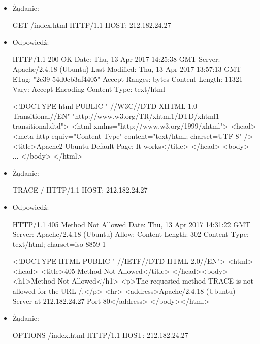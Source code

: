 \begin{itemize}\renewcommand{\labelitemii}{\scriptsize}
\item Żądanie:

\begin{code}
GET /index.html HTTP/1.1
HOST: 212.182.24.27


\end{code}

\item Odpowiedź:

\begin{code}
HTTP/1.1 200 OK
Date: Thu, 13 Apr 2017 14:25:38 GMT
Server: Apache/2.4.18 (Ubuntu)
Last-Modified: Thu, 13 Apr 2017 13:57:13 GMT
ETag: "2c39-54d0cb3af4405"
Accept-Ranges: bytes
Content-Length: 11321
Vary: Accept-Encoding
Content-Type: text/html


<!DOCTYPE html PUBLIC "-//W3C//DTD XHTML 1.0 Transitional//EN" 
"http://www.w3.org/TR/xhtml1/DTD/xhtml1-transitional.dtd">
<html xmlns="http://www.w3.org/1999/xhtml">
  <head>
    <meta http-equiv="Content-Type" content="text/html; charset=UTF-8" />
    <title>Apache2 Ubuntu Default Page: It works</title>
  </head>
  <body>
   ...
  </body>
</html>

\end{code}

\newpage 
\item Żądanie:

\begin{code}
TRACE / HTTP/1.1
HOST: 212.182.24.27

\end{code}

\item Odpowiedź:

\begin{code}
HTTP/1.1 405 Method Not Allowed
Date: Thu, 13 Apr 2017 14:31:22 GMT
Server: Apache/2.4.18 (Ubuntu)
Allow: 
Content-Length: 302
Content-Type: text/html; charset=iso-8859-1

<!DOCTYPE HTML PUBLIC "-//IETF//DTD HTML 2.0//EN">
<html><head>
<title>405 Method Not Allowed</title>
</head><body>
<h1>Method Not Allowed</h1>
<p>The requested method TRACE is not allowed for the URL /.</p>
<hr>
<address>Apache/2.4.18 (Ubuntu) Server at 212.182.24.27 Port 80</address>
</body></html>
\end{code}

\item Żądanie:

\begin{code}
OPTIONS /index.html HTTP/1.1
HOST: 212.182.24.27


\end{code}
\end{itemize}
